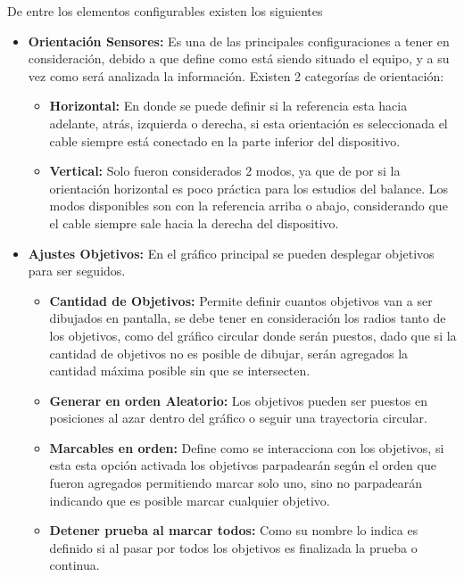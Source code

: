 \documentclass[12pt,a4paper]{article}
\begin{document}
De entre los elementos configurables existen los siguientes

\begin{itemize}
	\item \textbf{Orientación Sensores:} Es una de las principales configuraciones a tener en consideración, debido a que define como está siendo situado el equipo, y a su vez como será analizada la información.
	Existen 2 categorías de orientación:
	\begin{itemize}
		\item \textbf{Horizontal:} En donde se puede definir si la referencia esta hacia adelante, atrás, izquierda o derecha, si esta orientación es seleccionada el cable siempre está conectado en la parte inferior del dispositivo.
		\item \textbf{Vertical:} Solo fueron considerados 2 modos, ya que de por si la orientación horizontal es poco práctica para los estudios del balance.
		Los modos disponibles son con la referencia arriba o abajo, considerando que el cable siempre sale hacia la derecha del dispositivo.
	\end{itemize}
	\item \textbf{Ajustes Objetivos:} En el gráfico principal se pueden desplegar objetivos para ser seguidos.
	\begin{itemize}
		\item \textbf{Cantidad de Objetivos:} Permite definir cuantos objetivos van a ser dibujados en pantalla, se debe tener en consideración los radios tanto de los objetivos, como del gráfico circular donde serán puestos, dado que si la cantidad de objetivos no es posible de dibujar, serán agregados la cantidad máxima posible sin que se intersecten.
		\item \textbf{Generar en orden Aleatorio:} Los objetivos pueden ser puestos en posiciones al azar dentro del gráfico o seguir una trayectoria circular.
		\item \textbf{Marcables en orden:} Define como se interacciona con los objetivos, si esta esta opción activada los objetivos parpadearán según el orden que fueron agregados permitiendo marcar solo uno, sino no parpadearán indicando que es posible marcar cualquier objetivo.
		\item \textbf{Detener prueba al marcar todos:} Como su nombre lo indica es definido si al pasar por todos los objetivos es finalizada la prueba o continua.
	\end{itemize}
	

\end{itemize}
\end{document}
